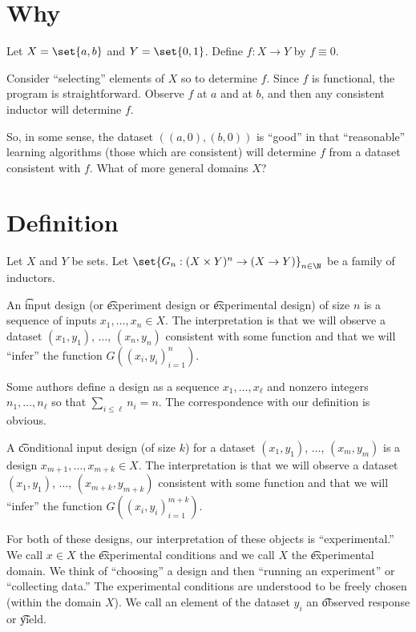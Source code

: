 

\section*{Why}

Let $X = \set{a, b}$ and $Y = \set{0, 1}$. Define $f: X \to Y$ by $f \equiv 0$.

Consider ``selecting'' elements of $X$ so to determine $f$.
Since $f$ is functional, the program is straightforward.
Observe $f$ at $a$ and at $b$, and then any consistent inductor will determine $f$.

So, in some sense, the dataset $((a,0), (b,0))$ is ``good'' in that ``reasonable'' learning algorithms (those which are consistent) will determine $f$ from a dataset consistent with $f$.
What of more general domains $X$?

\section*{Definition}

Let $X$ and $Y$ be sets.
Let $\set{G_n: (X \times Y)^n \to (X \to Y)}_{n \in \N}$ be a family of inductors.

An \t{input design} (or \t{experiment design} or \t{experimental design}) of size $n$ is a sequence of inputs $x_1, \dots , x_n \in X$.
The interpretation is that we will observe a dataset $(x_1, y_1)$, $\dots $, $(x_n, y_n)$ consistent with some function and that we will ``infer'' the function $G((x_i,y_i)_{i = 1}^{n})$.

Some authors define a design as a sequence $x_1, \dots , x_\ell $ and nonzero integers $n_1, \dots , n_{\ell }$ so that $\sum_{i \leq \ell } n_i = n$.
The correspondence with our definition is obvious.

A \t{conditional input design} (of size $k$) for a dataset $(x_1,y_1)$, $\dots $, $(x_m, y_m)$ is a design $x_{m+1}, \dots , x_{m+k} \in X$.
The interpretation is that we will observe a dataset $(x_1, y_1)$, $\dots $, $(x_{m+k}, y_{m+k})$ consistent with some function and that we will ``infer'' the function $G((x_i,y_i)_{i = 1}^{m+k})$.

For both of these designs, our interpretation of these objects is ``experimental.''
We call $x \in X$ the \t{experimental conditions} and we call $X$ the \t{experimental domain}.
We think of ``choosing'' a design and then ``running an experiment'' or ``collecting data.''
The experimental conditions are understood to be freely chosen (within the domain $X$).
We call an element of the dataset $y_i$ an \t{observed response} or \t{yield}.

